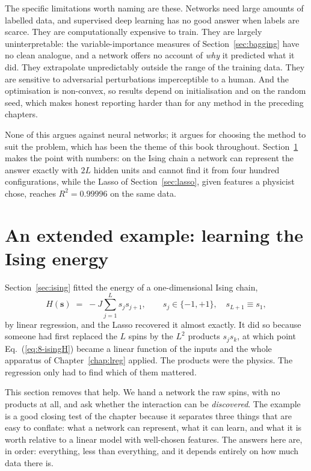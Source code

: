 The specific limitations worth naming are these.  Networks need large amounts
of labelled data, and supervised deep learning has no good answer when labels
are scarce.  They are computationally expensive to train.  They are largely
uninterpretable: the variable-importance measures of
Section~\ref{sec:bagging} have no clean analogue, and a network offers no
account of \emph{why} it predicted what it did.  They extrapolate
unpredictably outside the range of the training data.  They are sensitive to
adversarial perturbations imperceptible to a human.  And the optimisation is
non-convex, so results depend on initialisation and on the random seed, which
makes honest reporting harder than for any method in the preceding chapters.

None of this argues against neural networks; it argues for choosing the method
to suit the problem, which has been the theme of this book throughout.
Section~\ref{sec:ising8} makes the point with numbers: on the Ising chain a
network can represent the answer exactly with $2L$ hidden units and cannot
find it from four hundred configurations, while the Lasso of
Section~\ref{sec:lasso}, given features a physicist chose, reaches
$R^{2}=0.99996$ on the same data.

\section{An extended example: learning the Ising energy}
\label{sec:ising8}

Section~\ref{sec:ising} fitted the energy of a one-dimensional Ising chain,
\begin{equation}
  H(\bm{s}) \;=\; -J\sum_{j=1}^{L}s_j s_{j+1},
  \qquad s_j\in\{-1,+1\},\quad s_{L+1}\equiv s_1,
  \label{eq:8-isingH}
\end{equation}
by linear regression, and the Lasso recovered it almost exactly.  It did so
because someone had first replaced the $L$ spins by the $L^{2}$ products
$s_js_k$, at which point Eq.~(\ref{eq:8-isingH}) became a linear function of
the inputs and the whole apparatus of Chapter~\ref{chap:lreg} applied.  The
products were the physics.  The regression only had to find which of them
mattered.

This section removes that help.  We hand a network the raw spins, with no
products at all, and ask whether the interaction can be \emph{discovered}.
The example is a good closing test of the chapter because it separates three
things that are easy to conflate: what a network can represent, what it can
learn, and what it is worth relative to a linear model with well-chosen
features.  The answers here are, in order: everything, less than everything,
and it depends entirely on how much data there is.

